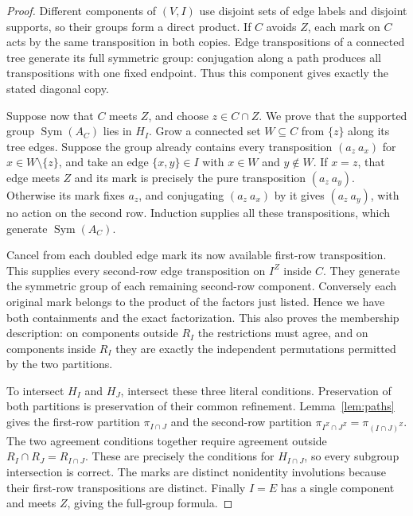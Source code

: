 \documentclass[a4paper,11pt]{article}
\newcommand{\Sym}{\operatorname{Sym}}
\begin{document}
\begin{proof}
Different components of $(V,I)$ use disjoint sets of edge labels and disjoint
supports, so their groups form a direct product. If $C$ avoids $Z$, each mark
on $C$ acts by the same transposition in both copies. Edge transpositions of
a connected tree generate its full symmetric group: conjugation along a path
produces all transpositions with one fixed endpoint. Thus this component gives
exactly the stated diagonal copy.

Suppose now that $C$ meets $Z$, and choose $z\in C\cap Z$.
We prove that the supported group $\Sym(A_C)$ lies in $H_I$.
Grow a connected set $W\subseteq C$ from $\{z\}$ along its tree edges.
Suppose the group already contains every transposition $(a_z\ a_x)$ for
$x\in W\setminus\{z\}$, and take an edge $\{x,y\}\in I$ with $x\in W$
and $y\notin W$. If $x=z$, that edge meets $Z$ and its mark is precisely
the pure transposition $(a_z\ a_y)$. Otherwise its mark fixes $a_z$, and
conjugating $(a_z\ a_x)$ by it gives $(a_z\ a_y)$, with no action on the
second row. Induction supplies all these transpositions, which generate
$\Sym(A_C)$.

Cancel from each doubled edge mark its now available first-row transposition.
This supplies every second-row edge transposition on $I^Z$ inside $C$.
They generate the symmetric group of each remaining second-row component.
Conversely each original mark belongs to the product of the factors just
listed. Hence we have both containments and the exact factorization. This
also proves the membership description: on components outside $R_I$ the
restrictions must agree, and on components inside $R_I$ they are exactly the
independent permutations permitted by the two partitions.

To intersect $H_I$ and $H_J$, intersect these three literal conditions.
Preservation of both partitions is preservation of their common refinement.
Lemma~\ref{lem:paths} gives the first-row partition $\pi_{I\cap J}$ and
the second-row partition $\pi_{I^Z\cap J^Z}=\pi_{(I\cap J)^Z}$.
The two agreement conditions together require agreement outside
$R_I\cap R_J=R_{I\cap J}$. These are precisely the conditions for
$H_{I\cap J}$, so every subgroup intersection is correct.
The marks are distinct nonidentity involutions because their first-row
transpositions are distinct. Finally $I=E$ has a single component and meets
$Z$, giving the full-group formula.
\end{proof}
\end{document}
